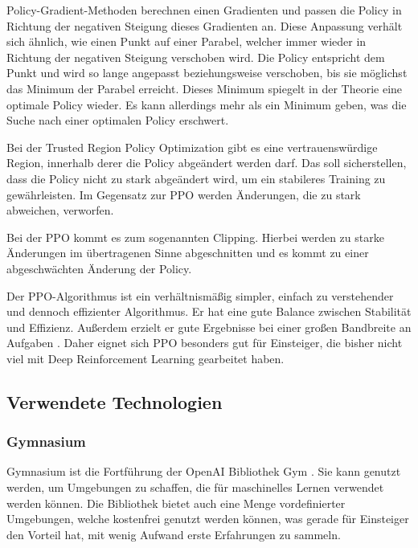 Policy-Gradient-Methoden berechnen einen Gradienten und passen die Policy in Richtung der negativen Steigung dieses Gradienten an. Diese Anpassung verhält sich ähnlich, wie einen Punkt auf einer Parabel, welcher immer wieder in Richtung der negativen Steigung verschoben wird. Die Policy entspricht dem Punkt und wird so lange angepasst beziehungsweise verschoben, bis sie möglichst das Minimum der Parabel erreicht. Dieses Minimum spiegelt in der Theorie eine optimale Policy wieder. Es kann allerdings mehr als ein Minimum geben, was die Suche nach einer optimalen Policy erschwert.

Bei der Trusted Region Policy Optimization gibt es eine vertrauenswürdige Region, innerhalb derer die Policy abgeändert werden darf. Das soll sicherstellen, dass die Policy nicht zu stark abgeändert wird, um ein stabileres Training zu gewährleisten. Im Gegensatz zur PPO werden Änderungen, die zu stark abweichen, verworfen.

Bei der PPO kommt es zum sogenannten Clipping. Hierbei werden zu starke Änderungen im übertragenen Sinne abgeschnitten und es kommt zu einer abgeschwächten Änderung der Policy.

Der PPO-Algorithmus ist ein verhältnismäßig simpler, einfach zu verstehender und dennoch effizienter Algorithmus. Er hat eine gute Balance zwischen Stabilität und Effizienz. Außerdem erzielt er gute Ergebnisse bei einer großen Bandbreite an Aufgaben \cite{schulman_proximal_2017}. Daher eignet sich PPO besonders gut für Einsteiger, die bisher nicht viel mit Deep Reinforcement Learning gearbeitet haben.
\subsection{Verwendete Technologien}
\subsubsection{Gymnasium}
Gymnasium ist die Fortführung der OpenAI Bibliothek Gym \cite{towers_gymnasium_2023}. Sie kann genutzt werden, um Umgebungen zu schaffen, die für maschinelles Lernen verwendet werden können. Die Bibliothek bietet auch eine Menge vordefinierter Umgebungen, welche kostenfrei genutzt werden können, was gerade für Einsteiger den Vorteil hat, mit wenig Aufwand erste Erfahrungen zu sammeln.

